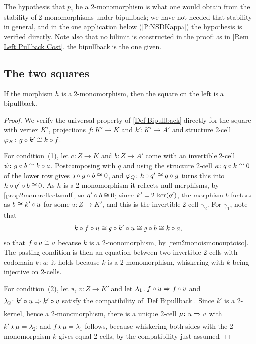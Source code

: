 \begin{remark}
  \label{Rem Bipullback Mono}
  The hypothesis that \(p_1\) be a 2-monomorphism is what one would obtain from the stability of 2-monomorphisms under bipullback; we have not needed that stability in general, and in the one application below (\prox\ref{P:NSDKappa}) the hypothesis is verified directly. Note also that no bilimit is constructed in the proof: as in \remx\ref{Rem Left Pullback Cost}, the bipullback is the one given.
\end{remark}

\subsection{The two squares}\label{SS:Squares}

\begin{proposition}
  \label{Mono Implies Left Pullback}   \leanok
  If the morphism \(h\) is a 2-monomorphism, then the square on the left is a bipullback.
\end{proposition}

\begin{proof}
  \leanok
  We verify the universal property of \ref{Def Bipullback} directly for the square with vertex \(K'\), projections \(f\colon K'\to K\) and \(k'\colon K'\to A'\) and structure 2-cell \(\varphi_K\colon g\circ k'\cong k\circ f\).

	For condition~(1), let \(a\colon Z\to K\) and \(b\colon Z\to A'\) come with an invertible 2-cell \(\psi\colon g\circ b\cong k\circ a\). Postcomposing with \(q\) and using the structure 2-cell \(\kappa\colon q\circ k\cong 0\) of the lower row gives \(q\circ g\circ b\cong 0\), and \(\varphi_Q\colon h\circ q'\cong q\circ g\) turns this into \(h\circ q'\circ b\cong 0\). As \(h\) is a 2-monomorphism it reflects null morphisms, by \prox\ref{prop2monoreflectsnull}, so \(q'\circ b\cong 0\); since \(k'=2\text{-}\mathrm{ker}(q')\), the morphism \(b\) factors as \(b\cong k'\circ u\) for some \(u\colon Z\to K'\), and this is the invertible 2-cell \(\gamma_2\). For \(\gamma_1\), note that
	\[
		k\circ f\circ u\cong g\circ k'\circ u\cong g\circ b\cong k\circ a\text{,}
	\]
	so that \(f\circ u\cong a\) because \(k\) is a 2-monomorphism, by \remx\ref{rem2monoismonouptoiso}. The pasting condition is then an equation between two invertible 2-cells with codomain \(k\comp a\); it holds because \(k\) is a 2-monomorphism, whiskering with \(k\) being injective on 2-cells.

	For condition~(2), let \(u\), \(v\colon Z\to K'\) and let \(\lambda_1\colon f\circ u\xRightarrow[]{}f\circ v\) and \(\lambda_2\colon k'\circ u\xRightarrow[]{}k'\circ v\) satisfy the compatibility of \ref{Def Bipullback}. Since \(k'\) is a 2-kernel, hence a 2-monomorphism, there is a unique 2-cell \(\mu\colon u\xRightarrow[]{}v\) with \(k'\star\mu=\lambda_2\); and \(f\star\mu=\lambda_1\) follows, because whiskering both sides with the 2-monomorphism \(k\) gives equal 2-cells, by the compatibility just assumed.
\end{proof}

